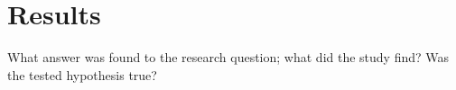 \chapter{Results}

What answer was found to the research question; what did the study find? Was the tested hypothesis true?
